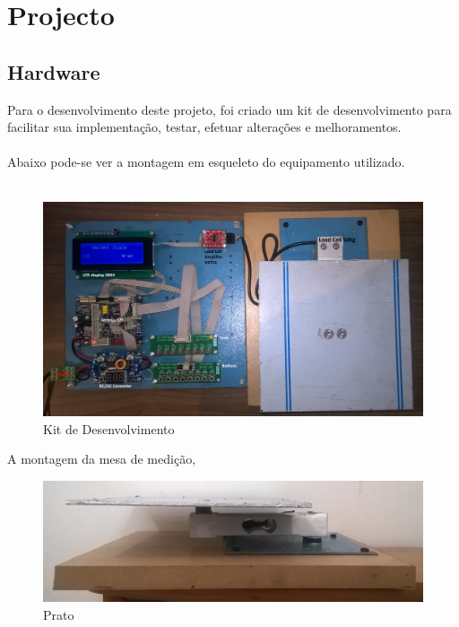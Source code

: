 \chapter{Projecto}
\section{Hardware}
Para o desenvolvimento deste projeto, foi criado um kit de desenvolvimento para facilitar sua implementação, testar, efetuar alterações e melhoramentos.\\
\\
Abaixo pode-se ver a montagem em esqueleto do equipamento utilizado.
\newline
\\
\\
\begin{figure}[H]
	\centering
	\includegraphics[scale=0.15]{./image/PESTA/kit/Kit_Desenvolvimento_2.jpg}
	\caption{Kit de Desenvolvimento}
	\label{Kit_Desenvolvimento_2}
\end{figure}
\newpage
A montagem da mesa de medição,
\begin{figure}[H]
	\centering
	\includegraphics[scale=0.15]{./image/PESTA/material/Prato.jpg}
	\caption{Prato}
	\label{Prato}
\end{figure}
